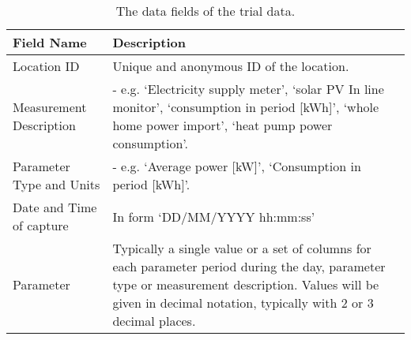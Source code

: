 \begin{table}
\centering
\begin{tabular}{|l|p{8cm}|}
\hline
Field Name                                                                      & Description                                                                                                                                                  \\ \hline
Location ID                                                                     & Unique and anonymous ID of the location.                                                                                                                     \\ \hline
Measurement Description                                                         & - e.g. ‘Electricity supply meter’, ‘solar PV In line monitor’,  ‘consumption in period {[}kWh{]}’, ‘whole home power import’, ‘heat pump power consumption’. \\ \hline
Parameter Type and Units                                                        & - e.g. ‘Average power {[}kW{]}’, ‘Consumption in period {[}kWh{]}’.                                                                                          \\ \hline
Date and Time of capture                                                        & In form ‘DD/MM/YYYY hh:mm:ss’                                                                                                                                \\ \hline
Parameter                                                                       & Typically a single value or a set of columns for each parameter period during the day, parameter type or measurement description.
Values will be given in decimal notation, typically with 2 or 3 decimal places.
\\ \hline
\end{tabular}
\caption{The data fields of the trial data.}
\label{tab:TrialDatadef}
\end{table}



